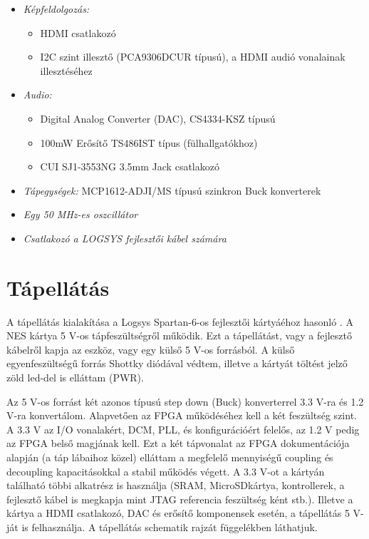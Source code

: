 \begin{itemize}
\begin{itemize}
		\end{itemize}	
	\item \emph{Képfeldolgozás:}
		\begin{itemize}
			\item HDMI csatlakozó 
			\item I2C szint illesztő (PCA9306DCUR típusú), a HDMI audió vonalainak illesztéséhez 
		\end{itemize}
	\item \emph{Audio:}
		\begin{itemize}
			\item Digital Analog Converter (DAC), CS4334-KSZ típusú  
			\item 100mW Erősítő TS486IST típus (fülhallgatókhoz)
			\item CUI SJ1-3553NG 3.5mm Jack csatlakozó
		\end{itemize}
	\item \emph{Tápegységek:} MCP1612-ADJI/MS típusú szinkron Buck konverterek
	\item \emph{Egy 50 MHz-es oszcillátor} 
	\item \emph{Csatlakozó a LOGSYS fejlesztői kábel számára} 
\end{itemize}
	
\section{Tápellátás}
	
	A tápellátás kialakítása a Logsys Spartan-6-os fejlesztői kártyáéhoz hasonló \cite{spatan6}. A NES kártya 5 V-os tápfeszültségről működik. Ezt a tápellátást, vagy a fejlesztő kábelről kapja az eszköz, vagy egy külső 5 V-os forrásból. A külső egyenfeszültségű forrás Shottky diódával védtem, illetve a kártyát töltést jelző zöld led-del is elláttam (PWR). 
	
	Az 5 V-os forrást két azonos típusú step down (Buck) konverterrel 3.3 V-ra és 1.2 V-ra konvertálom. Alapvetően az FPGA működéséhez kell a két feszültség szint. A 3.3 V az I/O vonalakért, DCM, PLL, és konfigurációért felelős, az 1.2 V pedig az FPGA belső magjának kell. Ezt a két tápvonalat az FPGA dokumentációja alapján (a táp lábaihoz közel) elláttam a megfelelő mennyiségű coupling és decoupling kapacitásokkal a stabil működés végett. A 3.3 V-ot a kártyán található többi alkatrész is használja (SRAM, MicroSDkártya, kontrollerek, a fejlesztő kábel is megkapja mint JTAG referencia feszültség ként stb.). Illetve a kártya a HDMI csatlakozó, DAC és erősítő komponensek esetén, a tápellátás 5 V-ját is felhasználja. A tápellátás schematik rajzát  függelékben láthatjuk. 
	 
